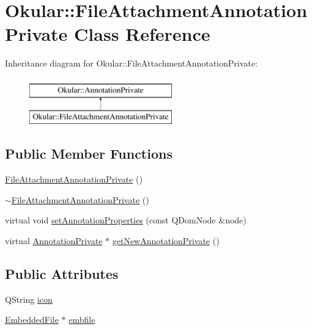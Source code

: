 \hypertarget{classOkular_1_1FileAttachmentAnnotationPrivate}{\section{Okular\+:\+:File\+Attachment\+Annotation\+Private Class Reference}
\label{classOkular_1_1FileAttachmentAnnotationPrivate}
}
Inheritance diagram for Okular\+:\+:File\+Attachment\+Annotation\+Private\+:\begin{figure}[H]
\begin{center}
\leavevmode
\includegraphics[height=2.000000cm]{classOkular_1_1FileAttachmentAnnotationPrivate}
\end{center}
\end{figure}
\subsection*{Public Member Functions}
\begin{DoxyCompactItemize}
\item 
\hyperlink{classOkular_1_1FileAttachmentAnnotationPrivate_a9e008824594457a0375fd224304907c0}{File\+Attachment\+Annotation\+Private} ()
\item 
\hyperlink{classOkular_1_1FileAttachmentAnnotationPrivate_a77d9ad462a3dcf25af76a53e7700ebae}{$\sim$\+File\+Attachment\+Annotation\+Private} ()
\item 
virtual void \hyperlink{classOkular_1_1FileAttachmentAnnotationPrivate_a4a769aeec33c486dfd0b807f0bae07a0}{set\+Annotation\+Properties} (const Q\+Dom\+Node \&node)
\item 
virtual \hyperlink{classOkular_1_1AnnotationPrivate}{Annotation\+Private} $\ast$ \hyperlink{classOkular_1_1FileAttachmentAnnotationPrivate_ada5fdfe9a184cd3ed440b662bb38d5c9}{get\+New\+Annotation\+Private} ()
\end{DoxyCompactItemize}
\subsection*{Public Attributes}
\begin{DoxyCompactItemize}
\item 
Q\+String \hyperlink{classOkular_1_1FileAttachmentAnnotationPrivate_a9ca542a052b18ab5cb7b37d7e5ddede4}{icon}
\item 
\hyperlink{classOkular_1_1EmbeddedFile}{Embedded\+File} $\ast$ \hyperlink{classOkular_1_1FileAttachmentAnnotationPrivate_a374db87a34e6d35a53ec4d00d0b00caa}{embfile}
\end{DoxyCompactItemize}


